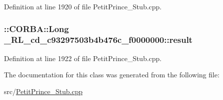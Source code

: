 Definition at line 1920 of file Petit\+Prince\+\_\+\+Stub.\+cpp.

\subsubsection[{\texorpdfstring{result}{result}}]{\setlength{\rightskip}{0pt plus 5cm}\+::C\+O\+R\+B\+A\+::\+Long \+\_\+R\+L\+\_\+cd\+\_\+c93297503b4b476c\+\_\+f0000000\+::result}\hypertarget{class__0_r_l__cd__c93297503b4b476c__f0000000_a2a668d01c3ab8f7a926dd60b837aa99d}{}\label{class__0_r_l__cd__c93297503b4b476c__f0000000_a2a668d01c3ab8f7a926dd60b837aa99d}


Definition at line 1922 of file Petit\+Prince\+\_\+\+Stub.\+cpp.



The documentation for this class was generated from the following file\+:\begin{DoxyCompactItemize}
\item 
src/\hyperlink{_petit_prince___stub_8cpp}{Petit\+Prince\+\_\+\+Stub.\+cpp}\end{DoxyCompactItemize}
